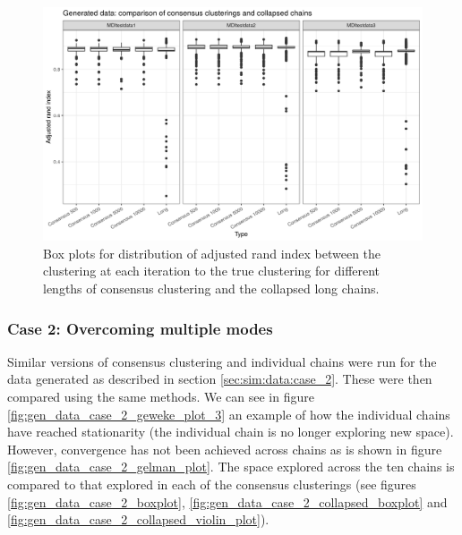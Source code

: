 \documentclass[12pt]{article} %
\begin{document}
		\newpage
		
		\begin{figure}[!htb]
			\centering
			\includegraphics[scale=0.65]{Images/Gen_data/Case_1/box_plot_ari_true_clustering_collapsed_long.png}
			\caption{Box plots for distribution of adjusted rand index between the clustering at each iteration to the true clustering for different lengths of consensus clustering and the collapsed long chains.}
			\label{fig:gen_data_case_1_collapsed_boxplot}
		\end{figure}
		
		\newpage

	
	\subsubsection{Case 2: Overcoming multiple modes} \label{sec:results:case_2}
	Similar versions of consensus clustering and individual chains were run for the data generated as described in section \ref{sec:sim:data:case_2}. These were then compared using the same methods. We can see in figure \ref{fig:gen_data_case_2_geweke_plot_3} an example of how the individual chains have reached stationarity (the individual chain is no longer exploring new space). However, convergence has not been achieved across chains as is shown in figure \ref{fig:gen_data_case_2_gelman_plot}. The space explored across the ten chains is compared to that explored in each of the consensus clusterings (see figures \ref{fig:gen_data_case_2_boxplot}, \ref{fig:gen_data_case_2_collapsed_boxplot} and \ref{fig:gen_data_case_2_collapsed_violin_plot}).
	
			\newpage
	
\end{document}
